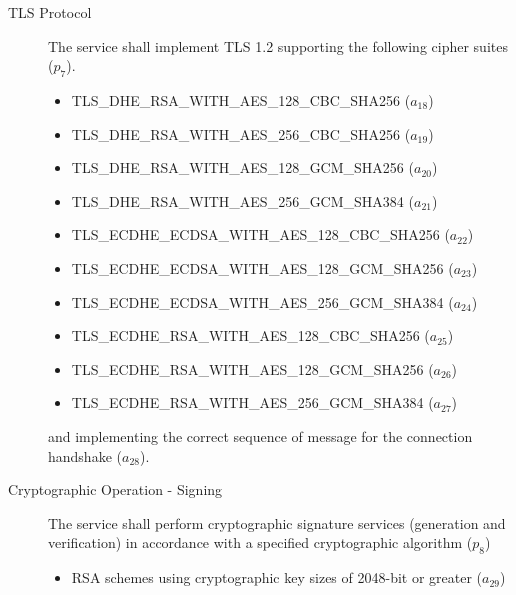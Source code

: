 \begin{description}
    \item[TLS Protocol] The service shall implement TLS 1.2 supporting the following cipher suites (\(p_7\)).
    \begin{itemize}
        \item TLS\_DHE\_RSA\_WITH\_AES\_128\_CBC\_SHA256 (\(a_{18}\))
        \item TLS\_DHE\_RSA\_WITH\_AES\_256\_CBC\_SHA256 (\(a_{19}\))
        \item TLS\_DHE\_RSA\_WITH\_AES\_128\_GCM\_SHA256 (\(a_{20}\))
        \item TLS\_DHE\_RSA\_WITH\_AES\_256\_GCM\_SHA384 (\(a_{21}\))
        \item TLS\_ECDHE\_ECDSA\_WITH\_AES\_128\_CBC\_SHA256 (\(a_{22}\))
        \item TLS\_ECDHE\_ECDSA\_WITH\_AES\_128\_GCM\_SHA256 (\(a_{23}\))
        \item TLS\_ECDHE\_ECDSA\_WITH\_AES\_256\_GCM\_SHA384 (\(a_{24}\))
        \item TLS\_ECDHE\_RSA\_WITH\_AES\_128\_CBC\_SHA256 (\(a_{25}\))
        \item TLS\_ECDHE\_RSA\_WITH\_AES\_128\_GCM\_SHA256 (\(a_{26}\))
        \item TLS\_ECDHE\_RSA\_WITH\_AES\_256\_GCM\_SHA384 (\(a_{27}\))
    \end{itemize} 
    and implementing the correct sequence of message for the connection handshake (\(a_{28}\)).
    
   \item[Cryptographic Operation - Signing] The service shall perform cryptographic signature services (generation and verification) in accordance with a specified cryptographic algorithm (\(p_8\))
    \begin{itemize}
        \item RSA schemes using cryptographic key sizes of 2048-bit or greater (\(a_{29}\))
    \end{itemize}

\end{description}


